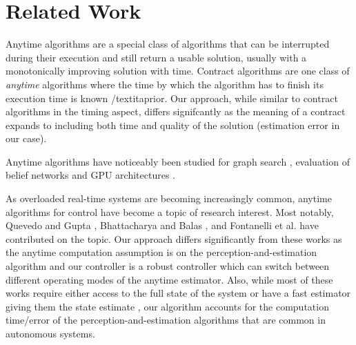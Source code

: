 \section{Related Work}
\label{related}

Anytime algorithms \cite{boddy} are a special class of algorithms that can be interrupted during their execution and still return a usable solution, usually with a monotonically improving solution with time. Contract algorithms \cite{zilbersteinAImag} are one class of \emph{anytime} algorithms where the time by which the algorithm has to finish its execution time is known /textit{aprior}. Our approach, while similar to contract algorithms in the timing aspect, differs signifcantly as the meaning of a contract expands to including both time and quality of the solution (estimation error in our case).

Anytime algorithms have noticeably been studied for graph search \cite{maxim}, evaluation of belief networks \cite{wellman} and GPU architectures \cite{RTSSanytime}.

As overloaded real-time systems are becoming increasingly common, anytime algorithms for control have become a topic of research interest. Most notably, Quevedo and Gupta \cite{sequence}, Bhattacharya and Balas \cite{balas}, and Fontanelli et al. \cite{fontanelli} have contributed on the topic. Our approach differs significantly from these works as the anytime computation assumption is on the perception-and-estimation algorithm and our controller is a robust controller which can switch between different operating modes of the anytime estimator. Also, while most of these works require either access to the full state of the system or have a fast estimator giving them the state estimate \cite{balas}, our algorithm accounts for the computation time/error of the perception-and-estimation algorithms that are common in autonomous systems.

